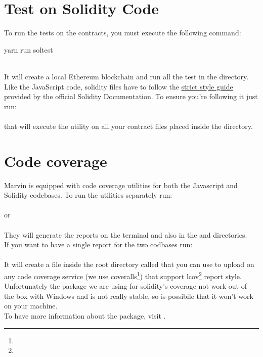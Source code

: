 \documentclass[ManualeSviluppatore]{subfiles}
\begin{document}
\section{Test on Solidity Code}
To run the tests on the contracts, you must execute the following command: \\
\begin{ttfamily} yarn run soltest \end{ttfamily} \\
It will create a local Ethereum blockchain and run all the test in the  directory. \\
Like the JavaScript code, solidity files have to follow the \href{https://solidity.readthedocs.io/en/v0.3.1/style-guide.html}{strict style guide} provided by the official Solidity Documentation. To ensure you're following it just run: \\
 \\
that will execute the  utility on all your contract files placed inside the  directory.

\section{Code coverage}
Marvin is equipped with code coverage utilities for both the Javascript and Solidity codebases.
To run the utilities separately run: \\
 \\
or \\
 \\
They will generate the reports on the terminal and also in the  and  directories. \\
If you want to have a single report for the two codbases run: \\
 \\
It will create a file inside the root directory called  that you can use to upload on any code coverage service (we use coveralls\footnote{}) that support lcov\footnote{} report style. \\
Unfortunately the package we are using for solidity's coverage not work out of the box with Windows and is not really stable, so is possibile that it won't work on your machine. \\
To have more information about the package, visit .
\end{document}
